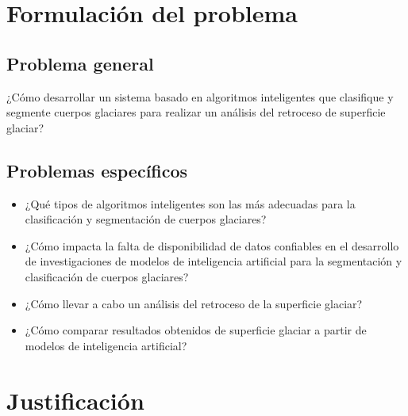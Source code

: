 

\section{Formulación del problema}
	\subsection{Problema general}
	¿Cómo desarrollar un sistema basado en algoritmos inteligentes que clasifique y segmente cuerpos glaciares para realizar un análisis del retroceso de superficie glaciar?
	\subsection{Problemas específicos}
	\begin{itemize}
		\item ¿Qué tipos de algoritmos inteligentes son las más adecuadas para la clasificación y segmentación de cuerpos glaciares?
		\item ¿Cómo impacta la falta de disponibilidad de datos confiables en el desarrollo de investigaciones de modelos de inteligencia artificial para la segmentación y clasificación de cuerpos glaciares?
		\item ¿Cómo llevar a cabo un análisis del retroceso de la superficie glaciar?
		\item ¿Cómo comparar resultados obtenidos de superficie glaciar a partir de modelos de inteligencia artificial?
	\end{itemize}
	
\section{Justificación}

